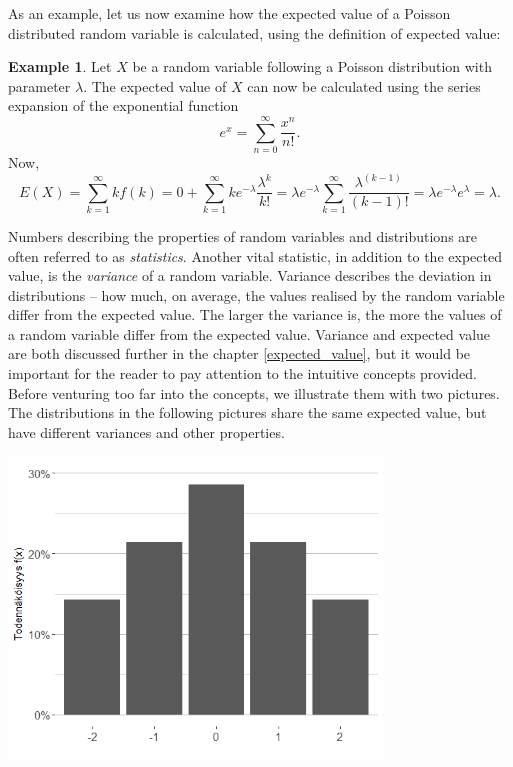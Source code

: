 \documentclass[12pt,a4paper,leqno]{report}
\theoremstyle{plain}
\theoremstyle{definition}
\newtheorem{esim}[equation]{Example}
\begin{document}
As an example, let us now examine how the expected value of a Poisson distributed random variable is calculated, using the definition of expected value: 

\begin{esim}
Let $X$ be a random variable following a Poisson distribution with parameter $\lambda$. The expected value of $X$ can now be calculated using the series expansion of the exponential function
\[
e^x = \sum_{n=0}^\infty \frac{x^n}{n!}.
\]
Now,
\[
E(X) = \sum_{k=1}^\infty k f(k) = 0 + \sum_{k=1}^\infty k e^{-\lambda} \frac{\lambda^k}{k!}  = \lambda e^{-\lambda}  \sum_{k=1}^\infty \frac{\lambda^{(k-1)}}{(k-1)!} = \lambda e^{-\lambda} e^{\lambda} = \lambda.  
\]
\end{esim}

Numbers describing the properties of random variables and distributions are often referred to as \emph{statistics}. Another vital statistic, in addition to the expected value, is the \emph{variance} of a random variable. Variance describes the deviation in distributions -- how much, on average, the values realised by the random variable differ from the expected value. The larger the variance is, the more the values of a random variable differ from the expected value. Variance and expected value are both discussed further in the chapter \ref{expected_value}, but it would be important for the reader to pay attention to the intuitive concepts provided. Before venturing too far into the concepts, we illustrate them with two pictures. The distributions in the following pictures share the same expected value, but have different variances and other properties.


\begin{center}
\includegraphics[height = 8cm]{var_a.png}
\end{center}
\end{document}
